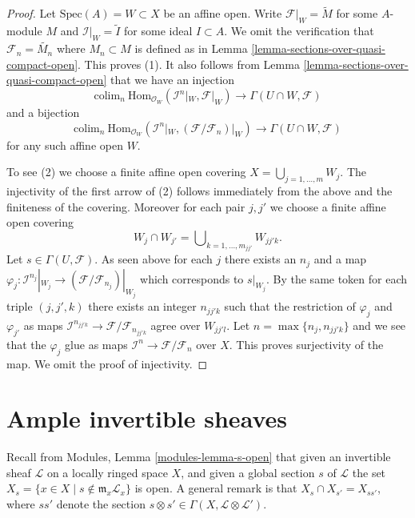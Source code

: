 \begin{proof}
Let $\text{Spec}(A) = W \subset X$ be an affine open.
Write $\mathcal{F}|_W = \widetilde{M}$ for some $A$-module $M$
and $\mathcal{I}|_W = \widetilde{I}$ for some ideal $I \subset A$.
We omit the verification that $\mathcal{F}_n = \widetilde{M_n}$ where
$M_n \subset M$ is defined as in
Lemma \ref{lemma-sections-over-quasi-compact-open}.
This proves (1). It also follows from
Lemma \ref{lemma-sections-over-quasi-compact-open}
that we have an injection
$$
\text{colim}_n\  \text{Hom}_{\mathcal{O}_W}(
\mathcal{I}^n|_W, \mathcal{F}|_W)
\longrightarrow
\Gamma(U \cap W, \mathcal{F})
$$
and a bijection
$$
\text{colim}_n\  \text{Hom}_{\mathcal{O}_W}(
\mathcal{I}^n|_W, (\mathcal{F}/\mathcal{F}_n)|_W)
\longrightarrow
\Gamma(U \cap W, \mathcal{F})
$$
for any such affine open $W$.

\medskip\noindent
To see (2) we choose a finite affine open covering
$X = \bigcup_{j = 1, \ldots, m} W_j$.
The injectivity of the first arrow of (2) follows immediately from
the above and the finiteness of the covering.
Moreover for each pair
$j, j'$ we choose a finite affine open covering
$$
W_j \cap W_{j'} = \bigcup\nolimits_{k = 1, \ldots, m_{jj'}} W_{jj'k}.
$$
Let $s \in \Gamma(U, \mathcal{F})$. As seen above for each $j$ there exists
an $n_j$ and a map
$\varphi_j : \mathcal{I}^{n_j}|_{W_j} \to
(\mathcal{F}/\mathcal{F}_{n_j})|_{W_j}$
which corresponds to $s|_{W_j}$.
By the same token for each triple $(j, j', k)$ there exists an integer
$n_{jj'k}$ such that the restriction of $\varphi_j$ and $\varphi_{j'}$
as maps $\mathcal{I}^{n_{jj'k}} \to \mathcal{F}/\mathcal{F}_{n_{jj'k}}$
agree over $W_{jj'l}$. Let $n = \max\{n_j, n_{jj'k}\}$ and we see that
the $\varphi_j$ glue as maps
$\mathcal{I}^n \to \mathcal{F}/\mathcal{F}_n$ over $X$.
This proves surjectivity of the map. We omit the proof of injectivity.
\end{proof}









\section{Ample invertible sheaves}
\label{section-ample}

\noindent
Recall from Modules, Lemma \ref{modules-lemma-s-open}
that given an invertible sheaf $\mathcal{L}$ on a locally ringed
space $X$, and given a global section $s$ of $\mathcal{L}$
the set $X_s = \{x \in X \mid s \not \in \mathfrak m_x\mathcal{L}_x\}$
is open. A general remark is that
$X_s \cap X_{s'} = X_{ss'}$, where $ss'$ denote
the section $s \otimes s' \in \Gamma(X, \mathcal{L}\otimes \mathcal{L}')$.

